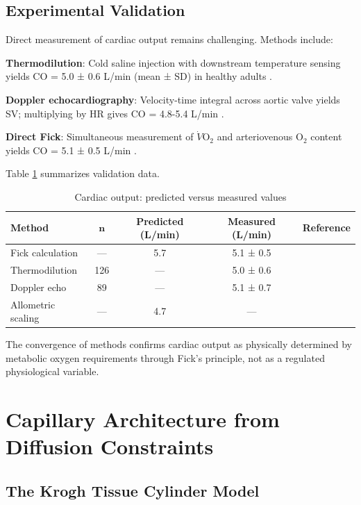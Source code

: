 \documentclass[12pt,a4paper]{article}
\theoremstyle{remark}
\begin{document}
\subsection{Experimental Validation}

Direct measurement of cardiac output remains challenging. Methods include:

\textbf{Thermodilution}: Cold saline injection with downstream temperature sensing yields CO = 5.0 ± 0.6 L/min (mean ± SD) in healthy adults \cite{ganz1971new}.

\textbf{Doppler echocardiography}: Velocity-time integral across aortic valve yields SV; multiplying by HR gives CO = 4.8-5.4 L/min \cite{lewis1984pulsed}.

\textbf{Direct Fick}: Simultaneous measurement of $\dot{V}\mathrm{O}_{2}$ and arteriovenous O$_{2}$ content yields CO = 5.1 ± 0.5 L/min \cite{lafarge1970pulmonary}.

Table \ref{tab:cardiac_validation} summarizes validation data.

\begin{table}[h]
\centering
\caption{Cardiac output: predicted versus measured values}
\label{tab:cardiac_validation}
\begin{tabular}{lcccc}
\toprule
\textbf{Method} & \textbf{$\boldsymbol{n}$} & \textbf{Predicted (L/min)} & \textbf{Measured (L/min)} & \textbf{Reference} \\
\midrule
Fick calculation & — & 5.7 & 5.1 ± 0.5 & \cite{lafarge1970pulmonary} \\
Thermodilution & 126 & — & 5.0 ± 0.6 & \cite{ganz1971new} \\
Doppler echo & 89 & — & 5.1 ± 0.7 & \cite{lewis1984pulsed} \\
Allometric scaling & — & 4.7 & — & \cite{west1997general} \\
\bottomrule
\end{tabular}
\end{table}

The convergence of methods confirms cardiac output as physically determined by metabolic oxygen requirements through Fick's principle, not as a regulated physiological variable.

\section{Capillary Architecture from Diffusion Constraints}
\label{sec:capillary}

\subsection{The Krogh Tissue Cylinder Model}
\end{document}
